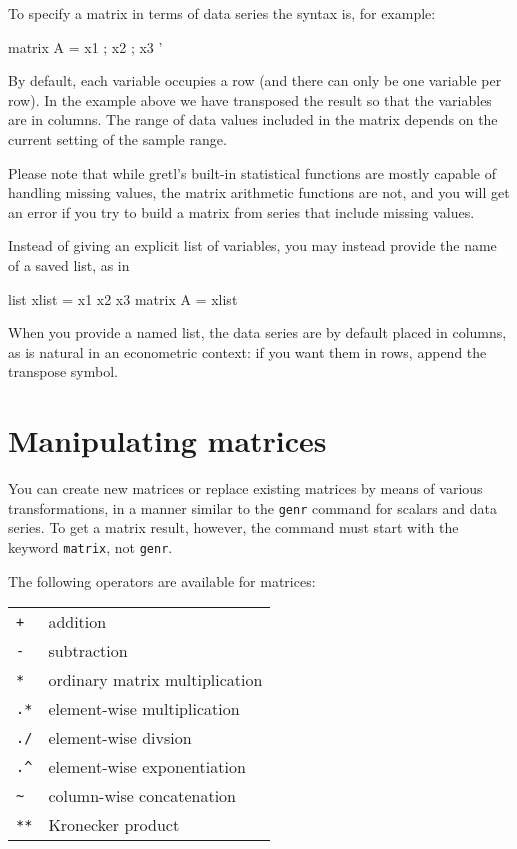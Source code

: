 To specify a matrix in terms of data series the syntax is, for
example:

\begin{code}
matrix A = { x1 ; x2 ; x3 }'
\end{code}

By default, each variable occupies a row (and there can only be one
variable per row).  In the example above we have transposed the result
so that the variables are in columns. The range of data values
included in the matrix depends on the current setting of the sample
range.

Please note that while gretl's built-in statistical functions are
mostly capable of handling missing values, the matrix arithmetic
functions are not, and you will get an error if you try to build a
matrix from series that include missing values.

Instead of giving an explicit list of variables, you may instead
provide the name of a saved list, as in

\begin{code}
list xlist = x1 x2 x3
matrix A = { xlist }
\end{code}

When you provide a named list, the data series are by default placed
in columns, as is natural in an econometric context: if you want them
in rows, append the transpose symbol.

\section{Manipulating matrices}
\label{matrix-manip}

You can create new matrices or replace existing matrices by means of
various transformations, in a manner similar to the \texttt{genr}
command for scalars and data series.  To get a matrix result, however,
the command must start with the keyword \texttt{matrix}, not
\texttt{genr}.

The following operators are available for matrices:

\begin{center}
\begin{tabular}{ll}
\texttt{+} & addition \\
\texttt{-} & subtraction \\
\texttt{*} & ordinary matrix multiplication \\
\texttt{.*} & element-wise multiplication \\
\texttt{./} & element-wise divsion \\
\verb+.^+ & element-wise exponentiation \\
\verb+~+ & column-wise concatenation \\
\texttt{**} & Kronecker product 
\end{tabular}
\end{center}

